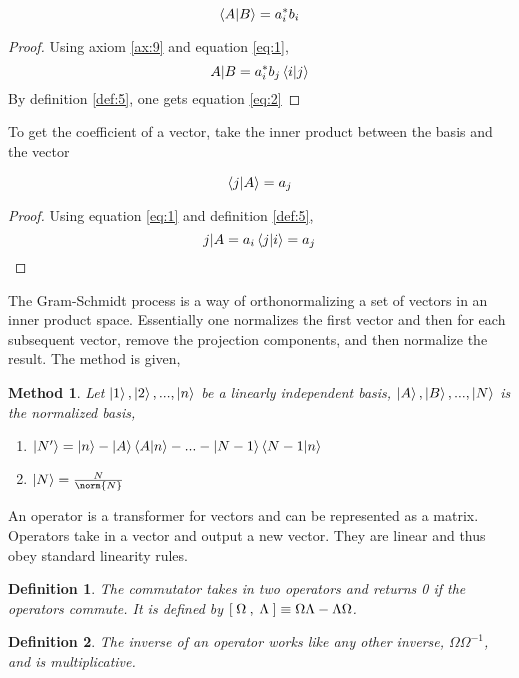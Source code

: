 \documentclass{tufte-book}
\newtheorem{definition}{Definition}
\newtheorem{method}{Method}
\newcommand{\commutator}[3][1.2em]{[ \makebox[#1]{$#2$} , \makebox[#1]{$#3$} ]}
\begin{document}
\begin{equation}
	\label{eq:2}
	\braket{A|B} = a_i^*b_i
\end{equation}

\begin{proof}
	Using axiom \ref{ax:9} and equation \ref{eq:1},
	\[{A|B} = a_i^*b_j\braket{i|j}\]
	By definition \ref{def:5}, one gets equation \ref{eq:2}
\end{proof}

To get the coefficient of a vector, take the inner product between the basis and the vector

\begin{equation}
	\label{eq:3}
	\braket{j|A} = a_j
\end{equation}

\begin{proof}
	Using equation \ref{eq:1} and definition \ref{def:5},
	\[{j|A} = a_i\braket{j|i} = a_j\]
\end{proof}

The Gram-Schmidt process is a way of orthonormalizing a set of vectors in an inner product space. Essentially one normalizes the first vector and then for each subsequent vector, remove the projection components, and then normalize the result. The method is given,

\begin{method}
	\label{meth:1}
	Let $\ket{1}, \ket{2}, ..., \ket{n}$ be a linearly independent basis, $\ket{A}, \ket{B}, ..., \ket{N}$ is the normalized basis,
	\begin{enumerate}
		\item $\ket{N'} = \ket{n} - \ket{A}\braket{A|n} - ... - \ket{N-1}\braket{N-1|n}$
		\item $\ket{N} = \frac{N}{\norm{N}}$
	\end{enumerate}
\end{method}

An operator is a transformer for vectors and can be represented as a matrix. Operators take in a vector and output a new vector. They are linear and thus obey standard linearity rules.

\begin{definition}
  \label{def:6}
  The commutator takes in two operators and returns 0 if the operators commute. It is defined by $\commutator{\Omega}{\Lambda} \equiv \Omega\Lambda - \Lambda\Omega$.
\end{definition}

\begin{definition}
  \label{def:7}
  The inverse of an operator works like any other inverse, $\Omega\Omega^{-1}$, and is multiplicative.
\end{definition}
\end{document}

